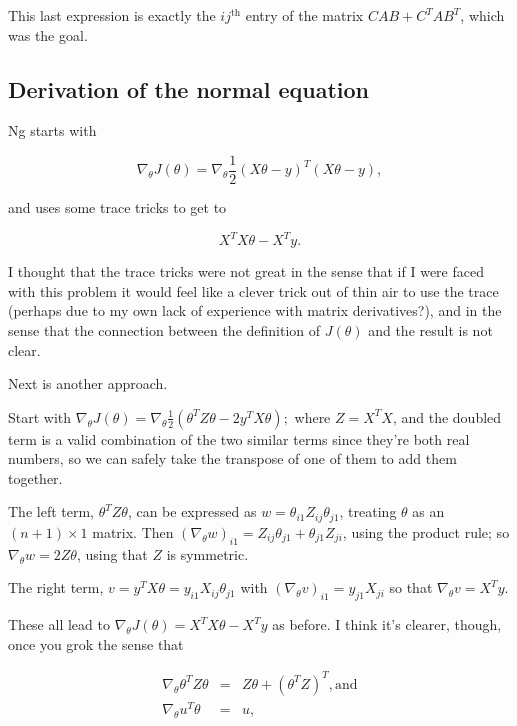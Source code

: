 \documentclass[]{article}
\begin{document}
This last expression is exactly the \(ij^\text{th}\) entry of the matrix
\(CAB + C^TAB^T\), which was the goal.

\subsection{Derivation of the normal
equation}\label{derivation-of-the-normal-equation}

Ng starts with

\[\nabla_\theta J(\theta) = \nabla_\theta\frac{1}{2}(X\theta-y)^T(X\theta-y),\]

and uses some trace tricks to get to

\[X^TX\theta - X^Ty.\]

I thought that the trace tricks were not great in the sense that if I
were faced with this problem it would feel like a clever trick out of
thin air to use the trace (perhaps due to my own lack of experience with
matrix derivatives?), and in the sense that the connection between the
definition of \(J(\theta)\) and the result is not clear.

Next is another approach.

Start with
\(\nabla_\theta J(\theta) = \nabla_\theta \frac{1}{2}(\theta^TZ\theta - 2y^TX\theta);\)
where \(Z=X^TX\), and the doubled term is a valid combination of the two
similar terms since they're both real numbers, so we can safely take the
transpose of one of them to add them together.

\newcommand{\nt}{\nabla_\theta}

The left term, \(\theta^T Z\theta\), can be expressed as
\(w=\theta_{i1}Z_{ij}\theta_{j1}\), treating \(\theta\) as an
\((n+1)\times 1\) matrix. Then
\((\nt w)_{i1} = Z_{ij}\theta_{j1} + \theta_{j1}Z_{ji}\), using the
product rule; so \(\nt w = 2Z\theta\), using that \(Z\) is symmetric.

The right term, \(v = y^TX\theta = y_{i1}X_{ij}\theta_{j1}\) with
\((\nt v)_{i1} = y_{j1}X_{ji}\) so that \(\nt v = X^Ty\).

These all lead to \(\nt J(\theta) = X^TX\theta - X^Ty\) as before. I
think it's clearer, though, once you grok the sense that

\[\begin{array}{rcl}
\nt \theta^TZ\theta & = & Z\theta + (\theta^T Z)^T, \text{and} \\
\nt u^T\theta & = & u, \\
\end{array}\]
\end{document}

